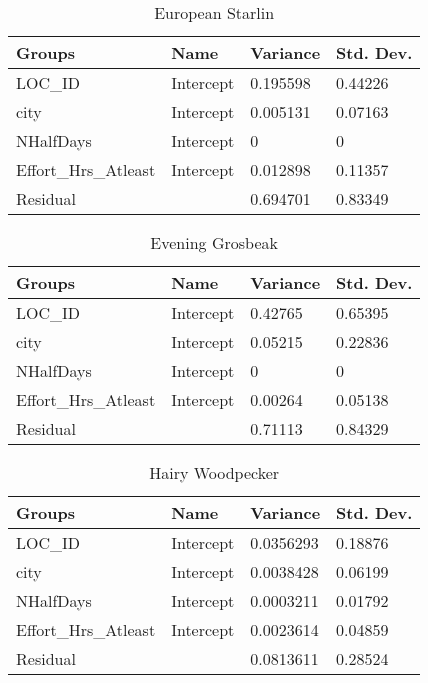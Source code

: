 \begin{longtable}[c]{|l|l|l|l|}
\caption{European Starlin}
\label{my-label}\\
\hline
Groups               & Name      & Variance & Std. Dev. \\ \hline
\endhead
%
LOC\_ID              & Intercept & 0.195598 & 0.44226   \\ \hline
city                 & Intercept & 0.005131 & 0.07163   \\ \hline
NHalfDays            & Intercept & 0        & 0         \\ \hline
Effort\_Hrs\_Atleast & Intercept & 0.012898 & 0.11357   \\ \hline
Residual             &           & 0.694701 & 0.83349   \\ \hline
\end{longtable}

\begin{longtable}[c]{|l|l|l|l|}
\caption{Evening Grosbeak}
\label{my-label}\\
\hline
Groups               & Name      & Variance & Std. Dev. \\ \hline
\endhead
%
LOC\_ID              & Intercept & 0.42765  & 0.65395   \\ \hline
city                 & Intercept & 0.05215  & 0.22836   \\ \hline
NHalfDays            & Intercept & 0        & 0         \\ \hline
Effort\_Hrs\_Atleast & Intercept & 0.00264  & 0.05138   \\ \hline
Residual             &           & 0.71113  & 0.84329   \\ \hline
\end{longtable}

\begin{longtable}[c]{|l|l|l|l|}
\caption{Hairy Woodpecker}
\label{my-label}\\
\hline
Groups               & Name      & Variance  & Std. Dev. \\ \hline
\endhead
%
LOC\_ID              & Intercept & 0.0356293 & 0.18876   \\ \hline
city                 & Intercept & 0.0038428 & 0.06199   \\ \hline
NHalfDays            & Intercept & 0.0003211 & 0.01792   \\ \hline
Effort\_Hrs\_Atleast & Intercept & 0.0023614 & 0.04859   \\ \hline
Residual             &           & 0.0813611 & 0.28524   \\ \hline
\end{longtable}


